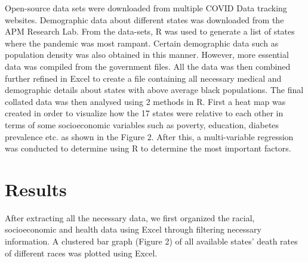\documentclass[10pt,twocolumn,letterpaper]{article}
\begin{document}
Open-source data sets were downloaded from multiple COVID Data tracking websites\cite{apm}. Demographic data about different states was downloaded from the APM Research Lab. \cite{cdc} \cite{pollution}
From the data-sets, R was used to generate a list of states where the pandemic was most rampant. Certain demographic data such as population density was also obtained in this manner. However, more essential data was compiled from the government files. 
All the data was then combined further refined in Excel to create a file containing all necessary medical and demographic details about states with above average black populations. 
The final collated data was then analysed using 2 methods in R. First a heat map was created in order to visualize how the 17 states were relative to each other in terms of some socioeconomic variables such as poverty, education, diabetes prevalence etc. as shown in the Figure 2. 
After this, a multi-variable regression was conducted to determine using R to determine the most important factors.



\section{Results}

After extracting all the necessary data, we first organized the racial, socioeconomic and health data using Excel through filtering necessary information. A clustered bar graph (Figure 2) of all available states’ death rates of different races was plotted using Excel. 
\end{document}
